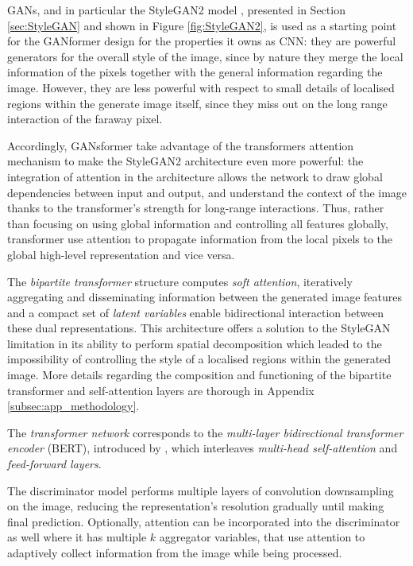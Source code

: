\documentclass{article}
\begin{document}
	GANs, and in particular the StyleGAN2 model \cite{karras2020analyzing}, presented in Section 
	\ref{sec:StyleGAN} and shown in Figure \ref{fig:StyleGAN2}, is used as a starting point for the 
	GANformer design for the properties it owns as CNN: they are powerful generators for the overall 
	style of the image, since by nature they merge the local information of the pixels together with the 
	general information regarding the image. 
	However, they are less powerful with respect to small details of localised regions within the 
	generate 
	image itself, since they miss out on the long range interaction of the faraway pixel.
	
	Accordingly, GANsformer take advantage of the transformers attention mechanism to make the 
	StyleGAN2 architecture even more powerful: the integration of attention in the architecture allows 
	the network to draw global dependencies between input and output, and understand the context of 
	the image thanks to the transformer's strength for long-range interactions.
	Thus, rather than focusing on using global information and controlling all features globally, 
	transformer use attention to propagate information from the local pixels to the global high-level 
	representation and vice versa. 
	
	The \textit{bipartite transformer} structure computes \textit{soft attention}, iteratively aggregating 
	and disseminating information between the generated image features and a compact set of 
	\textit{latent variables} enable bidirectional interaction between these dual representations. 
	This architecture offers a solution to the StyleGAN limitation in its ability to perform spatial 
	decomposition which leaded to the impossibility of controlling the style of a localised regions 
	within the generated image.
	More details regarding the composition and functioning of the bipartite transformer and 
	self-attention layers are thorough in Appendix \ref{subsec:app_methodology}. 
	
	The \textit{transformer network} corresponds to the \textit{multi-layer bidirectional transformer 
		encoder} (BERT), introduced by \citet{devlin2019bert}, which interleaves \textit{multi-head 
		self-attention} and \textit{feed-forward layers}. 
	
	The discriminator model performs multiple layers of convolution downsampling on the image, 
	reducing the representation's resolution gradually until making final prediction. 
	Optionally, attention can be incorporated into the discriminator as well where it has multiple $k$ 
	aggregator variables, that use attention to adaptively collect information from the image while being 
	processed. 
	
\end{document}
